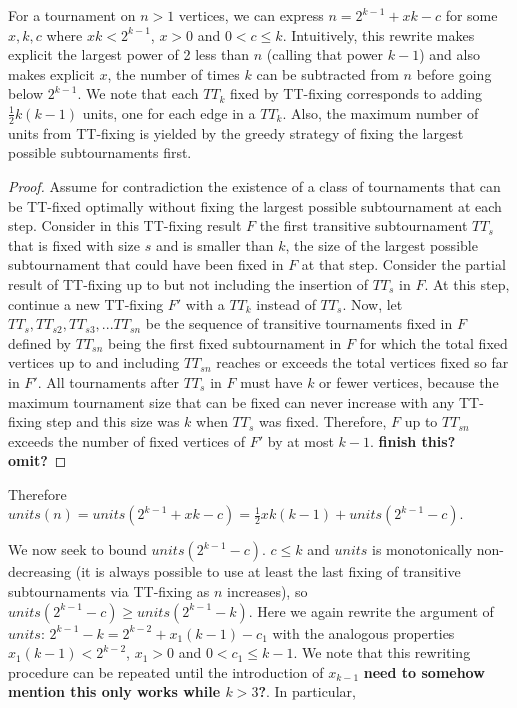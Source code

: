 \documentclass[a4paper,UKenglish,cleveref, autoref, thm-restate]{lipics-v2021}
\begin{document}
For a tournament on $n > 1$ vertices, we can express $n = 2^{k-1} + xk - c$ for some $x,k,c$ where $xk < 2^{k-1}$, $x>0$ and $0<c\leq k$. Intuitively, this rewrite makes explicit the largest power of 2 less than $n$ (calling that power $k-1$) and also makes explicit $x$, the number of times $k$ can be subtracted from $n$ before going below $2^{k-1}$. We note that each $TT_k$ fixed by TT-fixing corresponds to adding $\frac{1}{2}k(k-1)$ units, one for each edge in a $TT_k$. Also, the maximum number of units from TT-fixing is yielded by the greedy strategy of fixing the largest possible subtournaments first.

\begin{proof}
Assume for contradiction the existence of a class of tournaments that can be TT-fixed optimally without fixing the largest possible subtournament at each step. Consider in this TT-fixing result $F$ the first transitive subtournament $TT_s$ that is fixed with size $s$ and is smaller than $k$, the size of the largest possible subtournament that could have been fixed in $F$ at that step. Consider the partial result of TT-fixing up to but not including the insertion of $TT_s$ in $F$. At this step, continue a new TT-fixing $F'$ with a $TT_k$ instead of $TT_s$. Now, let $TT_s, TT_{s2}, TT_{s3},... TT_{sn}$ be the sequence of transitive tournaments fixed in $F$ defined by $TT_{sn}$ being the first fixed subtournament in $F$ for which the total fixed vertices up to and including $TT_{sn}$ reaches or exceeds the total vertices fixed so far in $F'$. All tournaments after $TT_s$ in $F$ must have $k$ or fewer vertices, because the maximum tournament size that can be fixed can never increase with any TT-fixing step and this size was $k$ when $TT_s$ was fixed. Therefore, $F$ up to $TT_{sn}$ exceeds the number of fixed vertices of $F'$ by at most $k-1$. \textbf{finish this? omit?}
\end{proof}


 Therefore $units(n) = units(2^{k-1} + xk - c) = \frac{1}{2}xk(k-1) + units(2^{k-1} - c)$.

We now seek to bound $units(2^{k-1} - c)$. $c \leq k$ and $units$ is monotonically non-decreasing (it is always possible to use at least the last fixing of transitive subtournaments via TT-fixing as $n$ increases), so $units(2^{k-1} - c) \geq units(2^{k-1} - k) $. Here we again rewrite the argument of $units$: $2^{k-1} - k = 2^{k-2} + x_1(k-1) - c_1$ with the analogous properties $x_1(k-1) < 2^{k-2}$, $x_1>0$ and $0<c_1\leq k-1$. We note that this rewriting procedure can be repeated until the introduction of $x_{k-1}$ \textbf{need to somehow mention this only works while $k>3$?}. In particular, 
\end{document}
